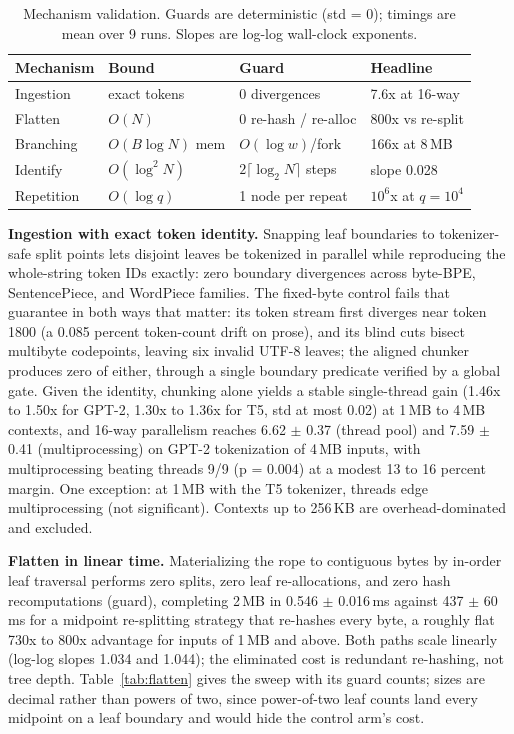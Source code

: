 \documentclass[10pt,conference]{IEEEtran}
\newcommand{\ms}{\,ms}
\begin{document}
\begin{table}[t]
\caption{Mechanism validation. Guards are deterministic (std = 0);
timings are mean over 9 runs. Slopes are log-log wall-clock exponents.}
\label{tab:mechanisms}
\centering
\footnotesize
\begin{tabular}{@{}llll@{}}
\toprule
Mechanism & Bound & Guard & Headline \\
\midrule
Ingestion & exact tokens & 0 divergences & 7.6x at 16-way \\
Flatten & $O(N)$ & 0 re-hash / re-alloc & 800x vs re-split \\
Branching & $O(B\log N)$ mem & $O(\log w)$/fork & 166x at 8\,MB \\
Identify & $O(\log^2 N)$ & $2\lceil\log_2 N\rceil$ steps & slope 0.028 \\
Repetition & $O(\log q)$ & 1 node per repeat & $10^6$x at $q{=}10^4$ \\
\bottomrule
\end{tabular}
\end{table}

\textbf{Ingestion with exact token identity.} Snapping leaf boundaries
to tokenizer-safe split points lets disjoint leaves be tokenized in
parallel while reproducing the whole-string token IDs exactly: zero
boundary divergences across byte-BPE, SentencePiece, and WordPiece
families. The fixed-byte control fails that guarantee in both ways that
matter: its token stream first diverges near token 1800 (a 0.085 percent
token-count drift on prose), and its blind cuts bisect multibyte
codepoints, leaving six invalid UTF-8 leaves; the aligned chunker
produces zero of either, through a single boundary predicate verified by
a global gate. Given the identity, chunking alone yields a stable single-thread gain
(1.46x to 1.50x for GPT-2, 1.30x to 1.36x for T5, std at most 0.02)
at 1\,MB to 4\,MB contexts, and
16-way parallelism reaches 6.62 $\pm$ 0.37 (thread pool) and 7.59
$\pm$ 0.41 (multiprocessing) on GPT-2 tokenization of 4\,MB inputs,
with multiprocessing beating threads 9/9 (p = 0.004) at a modest 13 to
16 percent margin. One exception: at 1\,MB with the T5 tokenizer,
threads edge multiprocessing (not significant). Contexts up to
256\,KB are overhead-dominated and excluded.

\textbf{Flatten in linear time.} Materializing the rope to contiguous
bytes by in-order leaf traversal performs zero splits, zero leaf
re-allocations, and zero hash recomputations (guard), completing 2\,MB
in 0.546 $\pm$ 0.016\ms{} against 437 $\pm$ 60\ms{} for a midpoint
re-splitting strategy that re-hashes every byte, a roughly flat 730x to
800x advantage for inputs of 1\,MB and above. Both paths scale
linearly (log-log slopes 1.034 and 1.044); the eliminated cost is
redundant re-hashing, not tree depth. Table~\ref{tab:flatten} gives
the sweep with its guard counts; sizes are decimal rather than powers
of two, since power-of-two leaf counts land every midpoint on a leaf
boundary and would hide the control arm's cost.
\end{document}
